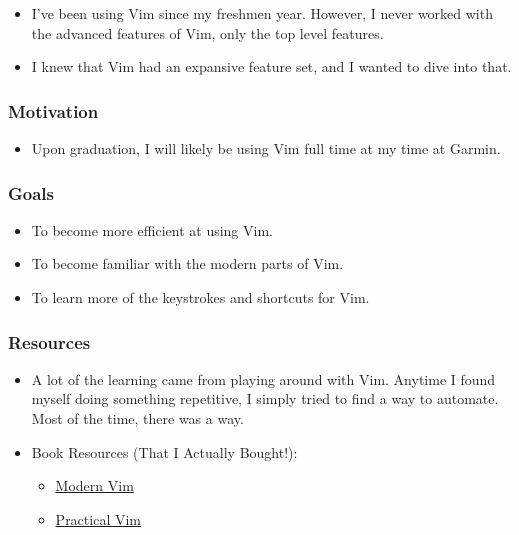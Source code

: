 \documentclass[xclolor=dvipsnames]{beamer}            %
\begin{document}
\begin{darkframes}
\begin{frame}
        \begin{itemize}
            \item I've been using Vim since my freshmen year. However, I never worked with the advanced features of Vim, only the top level features.
            \item I knew that Vim had an expansive feature set, and I wanted to dive into that.
        \end{itemize}
    \end{frame}


    \begin{frame}
        \frametitle{Motivation}

        \begin{itemize}
            \item Upon graduation, I will likely be using Vim full time at my time at Garmin.
        \end{itemize}
    \end{frame}


    \begin{frame}
        \frametitle{Goals}

        \begin{itemize}
            \item To become more efficient at using Vim.
            \item To become familiar with the modern parts of Vim.
            \item To learn more of the keystrokes and shortcuts for Vim.
        \end{itemize}
    \end{frame}

    \begin{frame}
        \frametitle{Resources}

        \begin{itemize}
            \item A lot of the learning came from playing around with Vim. Anytime I found myself doing something repetitive, I simply tried to find a way to automate. Most of the time, there was a way.

            \item Book Resources (That I Actually Bought!):
                \begin{itemize}
                    \item \href{https://pragprog.com/book/modvim/modern-vim}{Modern Vim}
                    \item \href{https://pragprog.com/book/dnvim2/practical-vim-second-edition}{Practical Vim}
                \end{itemize}


\end{itemize}
\end{frame}
\end{darkframes}
\end{document}
